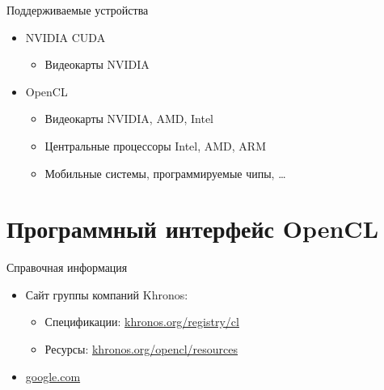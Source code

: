 \documentclass[@BEAMER_OPTIONS@]{beamer}
\begin{document}
\begin{frame}{Поддерживаемые устройства}
    \begin{itemize}
        \item NVIDIA CUDA
            \begin{itemize}
                \item Видеокарты NVIDIA
            \end{itemize}
        \item OpenCL
            \begin{itemize}
                \item Видеокарты NVIDIA, AMD, Intel
                \item Центральные процессоры Intel, AMD, ARM
                \item Мобильные системы, программируемые чипы, \ldots
            \end{itemize}
    \end{itemize}
\end{frame}

\section{Программный интерфейс OpenCL}
\begin{frame}
    \sectionpage
\end{frame}

\begin{frame}{Справочная информация}
    \begin{itemize}
        \item Сайт группы компаний Khronos:
            \begin{itemize}
                \item Спецификации: \href{http://khronos.org/registry/cl}{khronos.org/registry/cl}
                \item Ресурсы: \href{http://khronos.org/opencl/resources}{khronos.org/opencl/resources}
            \end{itemize}
        \item \href{https://www.google.com}{google.com}
    \end{itemize}
\end{frame}
\end{document}
